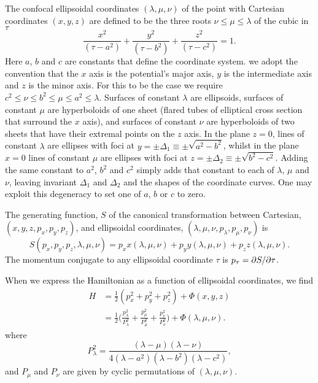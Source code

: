 \documentclass[useAMS,usenatbib,fleqn,a4paper]{mn2e}
\def\half{{\textstyle{\frac12}}}
\begin{document}
The confocal ellipsoidal coordinates $(\lambda,\mu,\nu)$ of the point with
Cartesian coordinates $(x,y,z)$ are defined to be the three roots
$\nu\le\mu\le\lambda$ of the
cubic in $\tau$
\begin{equation}
\frac{x^2}{(\tau-a^2)}+\frac{y^2}{(\tau-b^2)}+\frac{z^2}{(\tau-c^2)} = 1.
\end{equation}
 Here $a$, $b$ and $c$ are constants that define the coordinate system. we
adopt the convention that the $x$ axis is the potential's major axis,
$y$ is the intermediate axis and $z$ is the minor axis. For this to be the
case we require
$c^2\leq\nu\leq b^2\leq\mu\leq a^2\leq\lambda$. Surfaces of constant
$\lambda$ are ellipsoids, surfaces of constant $\mu$ are hyperboloids of one
sheet (flared tubes of elliptical cross section that surround the $x$ axis),
and surfaces of constant $\nu$ are hyperboloids of two sheets that have their
extremal points on the $z$ axis. In the plane $z=0$, lines of constant
$\lambda$ are ellipses with foci at $y=\pm\Delta_1\equiv\pm\sqrt{a^2-b^2}$,
whilst in the plane $x=0$ lines of constant $\mu$ are ellipses with foci at
$z=\pm\Delta_2\equiv\pm\sqrt{b^2-c^2}$. Adding the same constant to $a^2$,
$b^2$ and $c^2$ simply adds that constant to each of $\lambda$, $\mu$ and
$\nu$, leaving invariant $\Delta_1$ and $\Delta_2$ and the shapes of the
coordinate curves. One may exploit this degeneracy to set one of $a$, $b$ or
$c$ to zero.

 The generating function, $S$ of the canonical transformation between Cartesian,
$(x,y,z,p_x,p_y,p_z)$, and ellipsoidal coordinates,
$(\lambda,\mu,\nu,p_\lambda,p_\mu,p_\nu)$ is
\begin{equation}
S(p_x,p_y,p_z,\lambda,\mu,\nu) = p_x x(\lambda,\mu,\nu)
+p_y y(\lambda,\mu,\nu)
+p_z z(\lambda,\mu,\nu).
\end{equation}
The momentum conjugate to any ellipsoidal coordinate $\tau$ is $p_\tau =
\partial S/\partial \tau$.

When we express the Hamiltonian as a function of
ellipsoidal coordinates, we find
\begin{equation}
\begin{split}
H &= \half(p_x^2+p_y^2+p_z^2)+\Phi(x,y,z)
\\&=\half\Big(\frac{p_\lambda^2}{P_\lambda^2}+\frac{p_\mu^2}{P_\mu^2}+\frac{p_\nu^2}{P_\nu^2}\Big)+\Phi(\lambda,\mu,\nu).
\end{split}
\label{Eq::Hamiltonian}
\end{equation}
where
\begin{equation}
P^2_\lambda = \frac{(\lambda-\mu)(\lambda-\nu)}{4(\lambda-a^2)(\lambda-b^2)(\lambda-c^2)},
\end{equation}
and $P_\mu$ and $P_\nu$ are given by cyclic permutations of $(\lambda,\mu,\nu)$.
\end{document}
